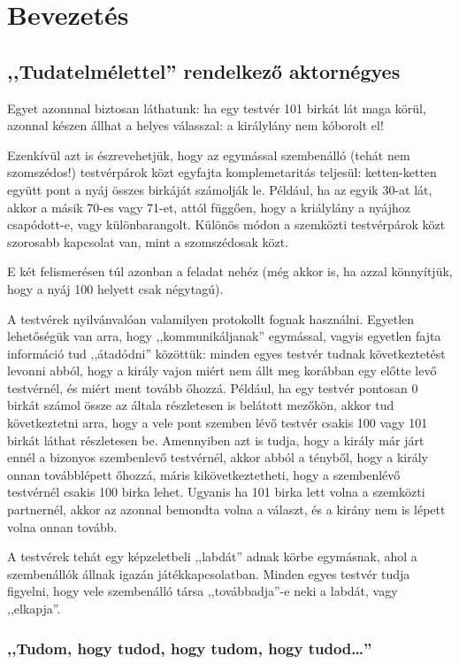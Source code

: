 \documentclass{article}
\begin{document}
	\section{Bevezetés}

	\subsection{,,Tudatelmélettel'' rendelkező aktornégyes}

	Egyet azonnnal biztosan láthatunk: ha egy testvér 101 birkát lát maga körül, azonnal készen állhat a helyes válasszal: a királylány nem kóborolt el!

	Ezenkívül azt is észrevehetjük, hogy az egymással szembenálló (tehát nem szomszédos!) testvérpárok közt egyfajta komplemetaritás teljesül: ketten-ketten együtt pont a nyáj összes birkáját számolják le. Például, ha az egyik 30-at lát, akkor a másik 70-es vagy 71-et, attól függően, hogy a kriálylány a nyájhoz csapódott-e, vagy különbarangolt. Különös módon a szemközti testvérpárok közt szorosabb kapcsolat van, mint a szomszédosak közt.

	E két felismerésen túl azonban a feladat nehéz (még akkor is, ha azzal könnyítjük, hogy a nyáj 100 helyett csak négytagú).
 
	A testvérek nyilvánvalóan valamilyen protokollt fognak használni. Egyetlen lehetőségük van arra, hogy ,,kommunikáljanak'' egymással, vagyis egyetlen fajta információ tud ,,átadódni'' közöttük: minden egyes testvér tudnak következtetést levonni abból, hogy a király vajon miért nem állt meg korábban egy előtte levő testvérnél, és miért ment tovább őhozzá. Például, ha egy testvér pontosan 0 birkát számol össze az általa részletesen is belátott mezőkön, akkor tud következtetni arra, hogy a vele pont szemben lévő testvér csakis 100 vagy 101 birkát láthat részletesen be. Amennyiben azt is tudja, hogy a király már járt ennél a bizonyos szembenlevő testvérnél, akkor abból a tényből, hogy a király onnan továbblépett őhozzá, máris kikövetkeztetheti, hogy a szembenlévő testvérnél csakis 100 birka lehet. Ugyanis ha 101 birka lett volna a szemközti partnernél, akkor az azonnal bemondta volna a választ, és a kirány nem is lépett volna onnan tovább.

	A testvérek tehát egy képzeletbeli ,,labdát'' adnak körbe egymásnak, ahol a szembenállók állnak igazán játékkapcsolatban. Minden egyes testvér tudja figyelni, hogy vele szembenálló társa ,,továbbadja''-e neki a labdát, vagy ,,elkapja''.

	\subsubsection{,,Tudom, hogy tudod, hogy tudom, hogy tudod\dots''}
\end{document}

